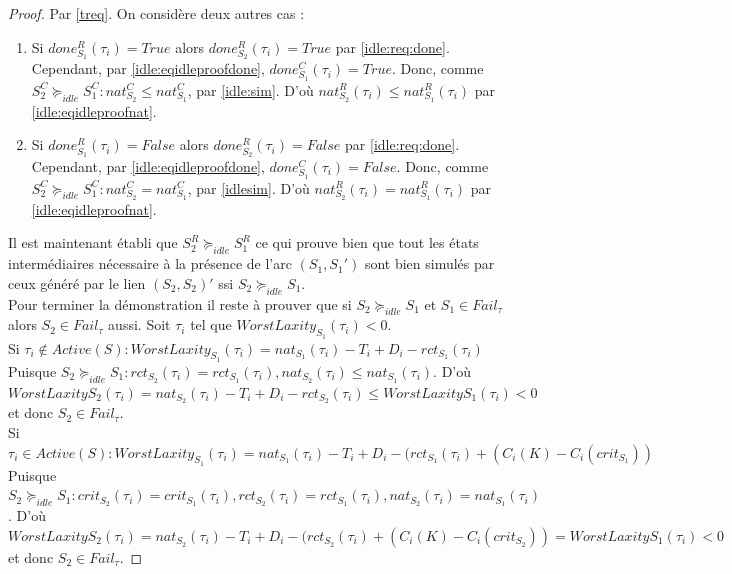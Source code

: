 \documentclass[11pt,a4paper,oneside]{book}
\theoremstyle{break}
\theoremstyle{breakplain}
\begin{document}
\begin{proof}
Par \autoref{treq}. On considère deux autres cas :
\begin{enumerate}[label=(\alph*)]
\item Si $done_{S_1}^R(\tau_i) = True$ alors $done_{S_2}^R(\tau_i) = True$ par \autoref{idle:req:done}. Cependant, par \autoref{idle:eqidleproofdone}, $done_{S_1}^C(\tau_i) = True$. Donc, comme $S^C_2 \succeq_{idle} S^C_1 : nat_{S_2}^C \leq nat_{S_1}^C$, par \autoref{idle:sim}. D'où $nat_{S_2}^R(\tau_i) \leq nat_{S_1}^R(\tau_i)$ par \autoref{idle:eqidleproofnat}.

\item Si $done_{S_1}^R(\tau_i) = False$ alors $done_{S_2}^R(\tau_i) = False$ par \autoref{idle:req:done}. Cependant, par \autoref{idle:eqidleproofdone}, $done_{S_1}^C(\tau_i) = False$. Donc, comme $S^C_2 \succeq_{idle} S^C_1 : nat_{S_2}^C = nat_{S_1}^C$, par \autoref{idlesim}. D'où $nat_{S_2}^R(\tau_i) = nat_{S_1}^R(\tau_i)$ par \autoref{idle:eqidleproofnat}.
\end{enumerate}


Il est maintenant établi que $S^R_2 \succeq_{idle} S^R_1$ ce qui prouve bien que tout les états intermédiaires nécessaire à la présence de l'arc $(S_1, S_1')$ sont bien simulés par ceux généré par le lien $(S_2, S_2)'$ ssi $S_2 \succeq_{idle} S_1$.\\

Pour terminer la démonstration il reste à prouver que si $S_2 \succeq_{idle} S_1$ et $S_1 \in Fail_\tau$ alors $S_2 \in Fail_\tau$ aussi.  Soit $\tau_i$ tel que  $WorstLaxity_{S_1}(\tau_i) < 0$.\\

Si $\tau_i \notin Active(S) : WorstLaxity_{S_1}(\tau_i) = nat_{S_1}(\tau_i) -T_i + D_i - rct_{S_1}(\tau_i)$\\
Puisque $S_2 \succeq_{idle} S_1 : rct_{S_2}(\tau_i) = rct_{S_1}(\tau_i), nat_{S_2}(\tau_i) \leq nat_{S_1}(\tau_i)$. D'où $WorstLaxity{S_2}(\tau_i) = nat_{S_2}(\tau_i) -T_i + D_i - rct_{S_2}(\tau_i) \leq WorstLaxity{S_1}(\tau_i) < 0$ et donc $S_2 \in Fail_\tau$.\\

Si $\tau_i \in Active(S) : WorstLaxity_{S_1}(\tau_i) = nat_{S_1}(\tau_i) -T_i + D_i - (rct_{S_1}(\tau_i) + (C_i(K)-C_i(crit_{S_1}))$\\
Puisque $S_2 \succeq_{idle} S_1 : crit_{S_2}(\tau_i) = crit_{S_1}(\tau_i),  rct_{S_2}(\tau_i) = rct_{S_1}(\tau_i), nat_{S_2}(\tau_i) = nat_{S_1}(\tau_i)$. D'où $WorstLaxity{S_2}(\tau_i) = nat_{S_2}(\tau_i) -T_i + D_i - (rct_{S_2}(\tau_i) + (C_i(K)-C_i(crit_{S_2})) = WorstLaxity{S_1}(\tau_i) < 0$ et donc $S_2 \in Fail_\tau$.

\end{proof}
\end{document}
